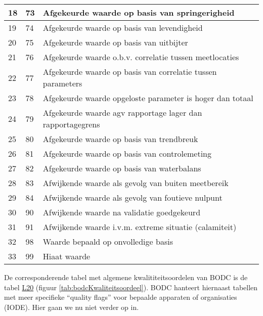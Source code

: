 \documentclass[
]{book}
\begin{document}
\begin{table}
\begin{tabular}[t]{l|l|l}
\hline
18 & 73 & Afgekeurde waarde op basis van springerigheid\\
\hline
19 & 74 & Afgekeurde waarde op basis van levendigheid\\
\hline
20 & 75 & Afgekeurde waarde op basis van uitbijter\\
\hline
21 & 76 & Afgekeurde waarde o.b.v. correlatie tussen meetlocaties\\
\hline
22 & 77 & Afgekeurde waarde op basis van correlatie tussen parameters\\
\hline
23 & 78 & Afgekeurde waarde opgeloste parameter is hoger dan totaal\\
\hline
24 & 79 & Afgekeurde waarde agv rapportage lager dan rapportagegrens\\
\hline
25 & 80 & Afgekeurde waarde op basis van trendbreuk\\
\hline
26 & 81 & Afgekeurde waarde op basis van controlemeting\\
\hline
27 & 82 & Afgekeurde waarde op basis van waterbalans\\
\hline
28 & 83 & Afwijkende waarde als gevolg van buiten meetbereik\\
\hline
29 & 84 & Afwijkende waarde als gevolg van foutieve nulpunt\\
\hline
30 & 90 & Afwijkende waarde na validatie goedgekeurd\\
\hline
31 & 91 & Afwijkende waarde i.v.m. extreme situatie (calamiteit)\\
\hline
32 & 98 & Waarde bepaald op onvolledige basis\\
\hline
33 & 99 & Hiaat waarde\\
\hline
\end{tabular}
\end{table}

De corresponderende tabel met algemene kwalititeitsoordelen van BODC is de tabel \href{http://vocab.nerc.ac.uk/collection/L20/current/}{L20} (figuur \ref{tab:bodcKwaliteitsoordeel}). BODC hanteert hiernaast tabellen met meer specifieke ``quality flags'' voor bepaalde apparaten of organisaties (IODE). Hier gaan we nu niet verder op in.
\end{document}
